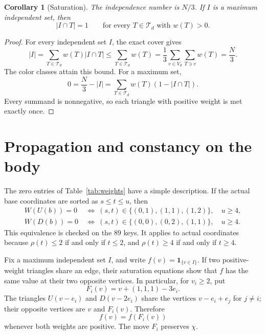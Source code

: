 \documentclass[11pt]{article}
\newtheorem{corollary}[theorem]{Corollary}
\newcommand{\one}{\mathbf 1}
\begin{document}
\begin{corollary}[Saturation]\label{cor:saturation}
The independence number is \(N/3\). If \(I\) is a maximum independent
set, then
\[
 |I\cap T|=1\qquad\text{for every \(T\in\mathcal T_d\) with \(w(T)>0\)}.
\]
\end{corollary}

\begin{proof}
For every independent set \(I\), the exact cover gives
\[
 |I|=\sum_{T\in\mathcal T_d}w(T)|I\cap T|
 \leq\sum_{T\in\mathcal T_d}w(T)
 =\frac13\sum_{v\in V_d}\sum_{T\ni v}w(T)
 =\frac N3.
\]
The color classes attain this bound. For a maximum set,
\[
 0=\frac N3-|I|
   =\sum_{T\in\mathcal T_d}w(T)(1-|I\cap T|).
\]
Every summand is nonnegative, so each triangle with positive weight
is met exactly once.
\end{proof}

\section{Propagation and constancy on the body}\label{sec:body}

The zero entries of Table~\ref{tab:weights} have a simple description.
If the actual base coordinates are sorted as \(s\leq t\leq u\), then
\begin{equation}\label{eq:zeros}
 \begin{aligned}
 W(U(b))=0
  &\ \Longleftrightarrow\
       (s,t)\in\{(0,1),(1,1),(1,2)\},\quad u\geq4,\\
 W(D(b))=0
  &\ \Longleftrightarrow\
       (s,t)\in\{(0,0),(0,2),(1,1)\},\quad u\geq4.
 \end{aligned}
\end{equation}
This equivalence is checked on the \(89\) keys. It applies to actual
coordinates because \(\rho(t)\leq2\) if and only if \(t\leq2\), and
\(\rho(t)\geq4\) if and only if \(t\geq4\).

Fix a maximum independent set \(I\), and write \(f(v)=\one_{\{v\in I\}}\).
If two positive-weight triangles share an edge, their saturation
equations show that \(f\) has the same value at their two opposite
vertices. In particular, for \(v_i\geq2\), put
\[
 F_i(v)=v+(1,1,1)-3e_i.
\]
The triangles \(U(v-e_i)\) and \(D(v-2e_i)\) share the vertices
\(v-e_i+e_j\) for \(j\ne i\); their opposite vertices are \(v\)
and \(F_i(v)\). Therefore
\begin{equation}\label{eq:propagation}
 f(v)=f(F_i(v))
\end{equation}
whenever both weights are positive. The move \(F_i\) preserves
\(\chi\).
\end{document}
